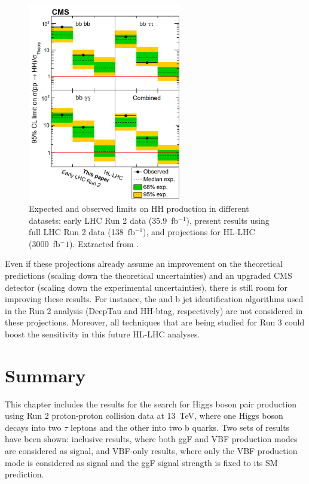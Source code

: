 \documentclass[../main.tex]{subfiles}
\begin{document}
\begin{figure}[h!]
\begin{center}
\includegraphics[width=0.6\textwidth]{Images/CMS-HIG-22-001_Figure_005-b}
\end{center}
\caption[CMS HH production cross section for different datasets.]{Expected and observed limits on HH production in different datasets: early LHC Run 2 data (35.9~fb${}^{-1}$), present results using full LHC Run 2 data (138~fb${}^{-1}$), and projections for HL-LHC (3000~fb${}^-1$). Extracted from \cite{hh:analysis:nature}.}
\label{hh:fig:lim_future}
\end{figure}

Even if these projections already assume an improvement on the theoretical predictions (scaling down the theoretical uncertainties) and an upgraded CMS detector (scaling down the experimental uncertainties), there is still room for improving these results. For instance, the \tauh{} and b jet identification algorithms used in the Run 2 analysis (DeepTau and HH-btag, respectively) are not considered in these projections. Moreover, all techniques that are being studied for Run 3 could boost the sensitivity in this future HL-LHC analyses.


\section{Summary}

This chapter includes the results for the search for Higgs boson pair production using Run 2 proton-proton collision data at 13~TeV, where one Higgs boson decays into two $\tau$ leptons and the other into two b quarks. Two sets of results have been shown: inclusive results, where both ggF and VBF production modes are considered as signal, and VBF-only results, where only the VBF production mode is considered as signal and the ggF signal strength is fixed to its SM prediction.
\end{document}
